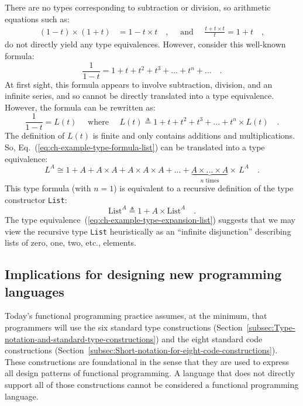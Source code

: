 There are no types corresponding to subtraction or division, so arithmetic
equations such as:
\begin{align*}
\left(1-t\right)\times\left(1+t\right) & =1-t\times t\quad,\quad\text{ and }\quad\frac{t+t\times t}{t}=1+t\quad,
\end{align*}
do not directly yield any type equivalences. However, consider this
well-known formula:
\[
\frac{1}{1-t}=1+t+t^{2}+t^{3}+...+t^{n}+...\quad.
\]
At first sight, this formula appears to involve subtraction, division,
and an infinite series, and so cannot be directly translated into
a type equivalence. However, the formula can be rewritten as:
\begin{equation}
\frac{1}{1-t}=L(t)\quad\text{ where }\quad L(t)\triangleq1+t+t^{2}+t^{3}+...+t^{n}\times L(t)\quad.\label{eq:ch-example-type-formula-list}
\end{equation}
The definition of $L(t)$ is finite and only contains additions and
multiplications. So, Eq.~(\ref{eq:ch-example-type-formula-list})
can be translated into a type equivalence:
\begin{equation}
L^{A}\cong1+A+A\times A+A\times A\times A+...+\underbrace{A\times...\times A}_{n\text{ times}}\times\,L^{A}\quad.\label{eq:ch-example-type-expansion-list}
\end{equation}
This type formula (with $n=1$) is equivalent to a recursive definition
of the type constructor \lstinline!List!:
\[
\text{List}^{A}\triangleq1+A\times\text{List}^{A}\quad.
\]
The type equivalence~(\ref{eq:ch-example-type-expansion-list}) suggests
that we may view the recursive type \lstinline!List! heuristically
as an \textsf{``}infinite disjunction\textsf{''} describing lists of zero, one, two,
etc., elements.

\subsection{Implications for designing new programming languages}

Today\textsf{'}s functional programming practice assumes, at the minimum, that
programmers will use the six standard type constructions (Section~\ref{subsec:Type-notation-and-standard-type-constructions})
and the eight standard code constructions (Section~\ref{subsec:Short-notation-for-eight-code-constructions}).
These constructions are foundational in the sense that they are used
to express all design patterns of functional programming. A language
that does not directly support all of those constructions cannot be
considered a functional programming language.

